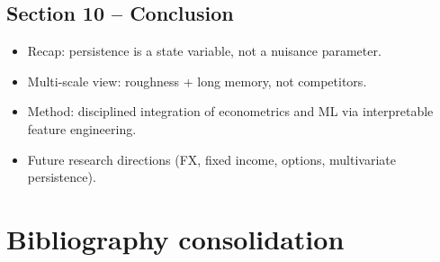 \documentclass[11pt,a4paper]{article}
\begin{document}
\subsection{Section 10 -- Conclusion}
\begin{itemize}
  \item Recap: persistence is a state variable, not a nuisance parameter.
  \item Multi-scale view: roughness + long memory, not competitors.
  \item Method: disciplined integration of econometrics and ML via
  interpretable feature engineering.
  \item Future research directions (FX, fixed income, options, multivariate
  persistence).
\end{itemize}

\section{Bibliography consolidation}
\end{document}
